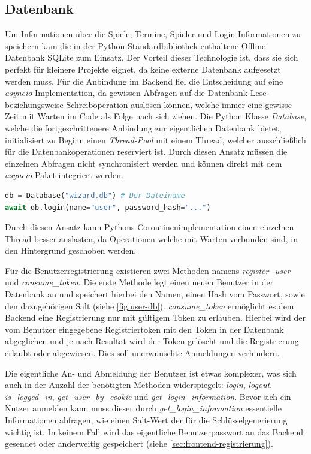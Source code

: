 \subsection{Datenbank}
Um Informationen über die Spiele, Termine, Spieler und Login-Informationen zu speichern kam die in der Python-Standardbibliothek enthaltene Offline-Datenbank SQLite zum Einsatz. Der Vorteil dieser Technologie ist, dass sie sich perfekt für kleinere Projekte eignet, da keine externe Datenbank aufgesetzt werden muss. Für die Anbindung im Backend fiel die Entscheidung auf eine \textit{asyncio}-Implementation, da gewissen Abfragen auf die Datenbank Lese- beziehungsweise Schreiboperation auslösen können, welche immer eine gewisse Zeit mit Warten im Code als Folge nach sich ziehen. Die Python Klasse \textit{Database}, welche die fortgeschrittenere Anbindung zur eigentlichen Datenbank bietet, initialisiert zu Beginn einen \textit{Thread-Pool} mit einem Thread, welcher ausschließlich für die Datenbankoperationen reserviert ist. Durch diesen Ansatz müssen die einzelnen Abfragen nicht synchronisiert werden und können direkt mit dem \textit{asyncio} Paket integriert werden.

\begin{lstlisting}[language=Python]
db = Database("wizard.db") # Der Dateiname
await db.login(name="user", password_hash="...")
\end{lstlisting}

Durch diesen Ansatz kann Pythons Coroutinenimplementation einen einzelnen Thread besser auslasten, da Operationen welche mit Warten verbunden sind, in den Hintergrund geschoben werden.

Für die Benutzerregistrierung existieren zwei Methoden namens \textit{register\_user} und \textit{consume\_token}. Die erste Methode legt einen neuen Benutzer in der Datenbank an und speichert hierbei den Namen, einen Hash vom Passwort, sowie den dazugehörigen Salt (siehe \cref{fig:user-db}). \textit{consume\_token} ermöglicht es dem Backend eine Registrierung nur mit gültigem Token zu erlauben. Hierbei wird der vom Benutzer eingegebene Registriertoken mit den Token in der Datenbank abgeglichen und je nach Resultat wird der Token gelöscht und die Registrierung erlaubt oder abgewiesen. Dies soll unerwünschte Anmeldungen verhindern.

Die eigentliche An- und Abmeldung der Benutzer ist etwas komplexer, was sich auch in der Anzahl der benötigten Methoden widerspiegelt: \textit{login}, \textit{logout}, \textit{is\_logged\_in}, \textit{get\_user\_by\_cookie} und \textit{get\_login\_information}. Bevor sich ein Nutzer anmelden kann muss dieser durch \textit{get\_login\_information} essentielle Informationen abfragen, wie einen Salt-Wert der für die Schlüsselgenerierung wichtig ist. In keinem Fall wird das eigentliche Benutzerpasswort an das Backend gesendet oder anderweitig gespeichert (siehe \cref{sec:frontend-registrierung}).

